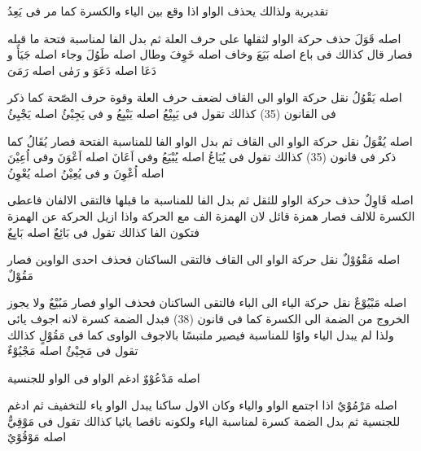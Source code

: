 \begin{twocol}
\begin{rightcol}
تقديرية ولذالك يحذف الواو اذا وقع بين الياء والكسرة كما مر فى يَعِدُ
\par
{}
اصله قَوَلَ حذف حركة الواو لثقلها على حرف العلة ثم بدل الفا لمناسبة فتحة ما قبله فصار قال كذالك فى باع اصله بَيَعَ وخاف اصله خَوِفَ وطال اصله طَوُلَ وجاء اصله جَيَأَ و دَعَا اصله دَعَوَ و رَمٰى اصله رَمَىَ
\par
{}
اصله يَقْوُلُ نقل حركة الواو الى القاف لضعف حرف العلة وقوة حرف الصّحة كما ذكر فى القانون (35) كذالك تقول فى يَبِيْعُ اصله يَبْيِعُ و فى يَجِيْئُ اصله يَجْيِئُ
\par
{}
اصله يُقْوَلُ نقل حركة الواو الى القاف ثم بدل الواو الفا للمناسبة الفتحة فصار يُقَالُ كما ذكر فى قانون (35) كذالك تقول فى يُبَاعُ اصله يُبْيَعُ وفى اَعَانَ اصله اَعْوَنَ وفى اُعِيْنَ اصله اُعْوِنَ و فى يُعِيْنُ اصله يُعْوِنُ
\end{rightcol}
\begin{leftcol}
اصله قَاوِلٌ حذف حركة الواو للثقل ثم بدل الفا للمناسبة ما قبلها فالتقى الالفان فاعطى الكسرة للالف فصار همزة قائل لان الهمزة الف مع الحركة واذا ازيل الحركة عن الهمزة فتكون الفا كذالك تقول فى بَائِعٌ اصله بَايِعٌ
\par
{}
اصله مَقْوُوْلٌ نقل حركة الواو الى القاف فالتقى الساكنان فحذف احدى الواوين فصار مَقُوْلٌ
\par
{}
اصله مَبْيُوْعٌ نقل حركة الياء الى الباء فالتقى الساكنان فحذف الواو فصار مَبُيْعٌ ولا يجوز الخروج من الضمة الى الكسرة كما فى قانون (38) فبدل الضمة كسرة لانه اجوف يائى ولذا لم يبدل الياء واوًا للمناسبة فيصير ملتبسًا بالاجوف الواوى كما فى مَقُوْلٍ كذالك تقول فى مَجِيْئٌ اصله مَجْيُوْءٌ
\par
{}
اصله مَدْعُوْوٌ ادغم الواو فى الواو للجنسية
\par
{}
اصله مَرْمُوْيٌ اذا اجتمع الواو والياء وكان الاول ساكنا يبدل الواو ياء للتخفيف ثم ادغم للجنسية ثم بدل الضمة كسرة لمناسبة الياء ولكونه ناقصا يائيا كذالك تقول فى مَوْقِيٌّ اصله مَوْقُوْيٌ
\end{leftcol}
\end{twocol}

